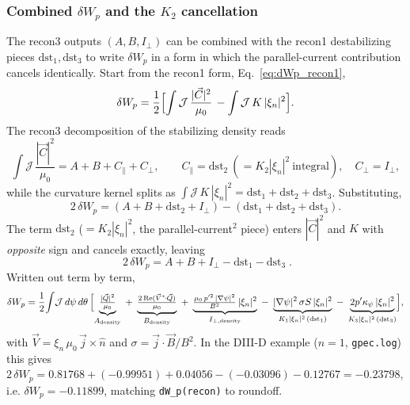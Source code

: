 \documentclass[10pt,a4paper]{article}
\numberwithin{equation}{section}
\begin{document}
\subsubsection{Combined $\delta W_p$ and the $K_2$ cancellation}
\label{sec:recon3_combined}

The recon3 outputs $(A,B,I_\perp)$ can be combined with the recon1
destabilizing pieces $\mathrm{dst}_1,\mathrm{dst}_3$ to write $\delta W_p$ in a
form in which the parallel-current contribution cancels identically.  Start
from the recon1 form, Eq.~\eqref{eq:dWp_recon1},
\begin{equation}
\delta W_p=\frac12\Bigl[\int\mathcal J\,\frac{|\vec C|^2}{\mu_0}\,
-\int\mathcal J\,K\,|\xi_n|^2\Bigr].
\end{equation}
The recon3 decomposition of the stabilizing density reads
\begin{equation}
\int\mathcal J\,\frac{|\vec C|^2}{\mu_0}
=A+B+C_\parallel+C_\perp,
\qquad
C_\parallel=\mathrm{dst}_2\ (=K_2|\xi_n|^2\ \text{integral}),\quad
C_\perp=I_\perp,
\end{equation}
while the curvature kernel splits as
$\int\mathcal J\,K\,|\xi_n|^2=\mathrm{dst}_1+\mathrm{dst}_2+\mathrm{dst}_3$.
Substituting,
\begin{equation}
2\,\delta W_p
=(A+B+\mathrm{dst}_2+I_\perp)
-(\mathrm{dst}_1+\mathrm{dst}_2+\mathrm{dst}_3).
\end{equation}
The term $\mathrm{dst}_2$ ($=K_2|\xi_n|^2$, the parallel-current$^2$ piece)
enters $|\vec C|^2$ and $K$ with \emph{opposite} sign and cancels exactly,
leaving
\begin{equation}
\boxed{\;2\,\delta W_p=A+B+I_\perp-\mathrm{dst}_1-\mathrm{dst}_3\;.}
\label{eq:dWp_combined}
\end{equation}
Written out term by term,
\begin{equation}
\delta W_p
=\frac12\!\int\!\mathcal J\,d\psi\,d\theta\,
\Bigl[
\underbrace{\tfrac{|\vec Q|^2}{\mu_0}}_{A_{\text{density}}}
\;+\;
\underbrace{\tfrac{2\,\mathrm{Re}(\vec V^{*}\!\cdot\vec Q)}{\mu_0}}_{B_{\text{density}}}
\;+\;
\underbrace{\tfrac{\mu_0\,p'^2\,|\nabla\psi|^2}{B^2}\,|\xi_n|^2}_{I_{\perp,\text{density}}}
\;-\;
\underbrace{|\nabla\psi|^2\,\sigma S\,|\xi_n|^2}_{K_1|\xi_n|^2\,(\mathrm{dst}_1)}
\;-\;
\underbrace{2p'\kappa_\psi\,|\xi_n|^2}_{K_3|\xi_n|^2\,(\mathrm{dst}_3)}
\Bigr],
\end{equation}
with $\vec V=\xi_n\,\mu_0\,\vec j\times\hat n$ and
$\sigma=\vec j\cdot\vec B/B^2$.  In the DIII-D example
($n=1$, \texttt{gpec.log}) this gives
$2\,\delta W_p=0.81768+(-0.99951)+0.04056-(-0.03096)-0.12767=-0.23798$,
i.e. $\delta W_p=-0.11899$, matching \texttt{dW\_p(recon)} to roundoff.
\end{document}
